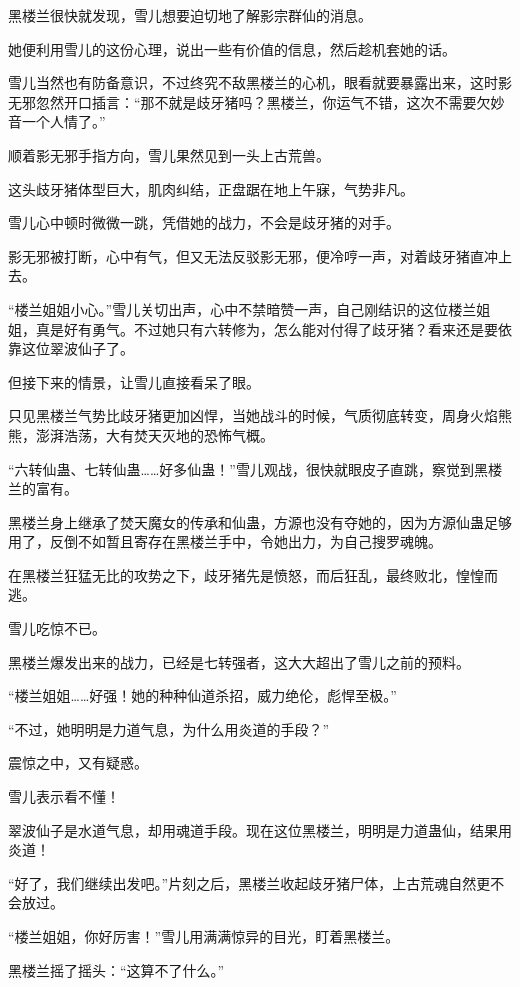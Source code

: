 \begin{this_body}
黑楼兰很快就发现，雪儿想要迫切地了解影宗群仙的消息。

她便利用雪儿的这份心理，说出一些有价值的信息，然后趁机套她的话。

雪儿当然也有防备意识，不过终究不敌黑楼兰的心机，眼看就要暴露出来，这时影无邪忽然开口插言：“那不就是歧牙猪吗？黑楼兰，你运气不错，这次不需要欠妙音一个人情了。”

顺着影无邪手指方向，雪儿果然见到一头上古荒兽。

这头歧牙猪体型巨大，肌肉纠结，正盘踞在地上午寐，气势非凡。

雪儿心中顿时微微一跳，凭借她的战力，不会是歧牙猪的对手。

影无邪被打断，心中有气，但又无法反驳影无邪，便冷哼一声，对着歧牙猪直冲上去。

“楼兰姐姐小心。”雪儿关切出声，心中不禁暗赞一声，自己刚结识的这位楼兰姐姐，真是好有勇气。不过她只有六转修为，怎么能对付得了歧牙猪？看来还是要依靠这位翠波仙子了。

但接下来的情景，让雪儿直接看呆了眼。

只见黑楼兰气势比歧牙猪更加凶悍，当她战斗的时候，气质彻底转变，周身火焰熊熊，澎湃浩荡，大有焚天灭地的恐怖气概。

“六转仙蛊、七转仙蛊……好多仙蛊！”雪儿观战，很快就眼皮子直跳，察觉到黑楼兰的富有。

黑楼兰身上继承了焚天魔女的传承和仙蛊，方源也没有夺她的，因为方源仙蛊足够用了，反倒不如暂且寄存在黑楼兰手中，令她出力，为自己搜罗魂魄。

在黑楼兰狂猛无比的攻势之下，歧牙猪先是愤怒，而后狂乱，最终败北，惶惶而逃。

雪儿吃惊不已。

黑楼兰爆发出来的战力，已经是七转强者，这大大超出了雪儿之前的预料。

“楼兰姐姐……好强！她的种种仙道杀招，威力绝伦，彪悍至极。”

“不过，她明明是力道气息，为什么用炎道的手段？”

震惊之中，又有疑惑。

雪儿表示看不懂！

翠波仙子是水道气息，却用魂道手段。现在这位黑楼兰，明明是力道蛊仙，结果用炎道！

“好了，我们继续出发吧。”片刻之后，黑楼兰收起歧牙猪尸体，上古荒魂自然更不会放过。

“楼兰姐姐，你好厉害！”雪儿用满满惊异的目光，盯着黑楼兰。

黑楼兰摇了摇头：“这算不了什么。”


\end{this_body}
